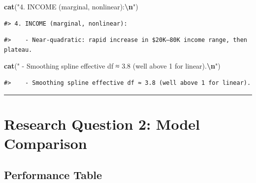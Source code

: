 \documentclass[
]{article}
\newenvironment{Shaded}{\begin{snugshade}}{\end{snugshade}}
\newcommand{\FunctionTok}[1]{\textcolor[rgb]{0.13,0.29,0.53}{\textbf{#1}}}
\newcommand{\NormalTok}[1]{#1}
\newcommand{\SpecialCharTok}[1]{\textcolor[rgb]{0.81,0.36,0.00}{\textbf{#1}}}
\newcommand{\StringTok}[1]{\textcolor[rgb]{0.31,0.60,0.02}{#1}}
\begin{document}
\begin{Shaded}
\begin{Highlighting}[]
\FunctionTok{cat}\NormalTok{(}\StringTok{"4. INCOME (marginal, nonlinear):}\SpecialCharTok{\textbackslash{}n}\StringTok{"}\NormalTok{)}
\end{Highlighting}
\end{Shaded}

\begin{verbatim}
#> 4. INCOME (marginal, nonlinear):
\end{verbatim}

\begin{Shaded}
\end{Shaded}

\begin{verbatim}
#>    - Near-quadratic: rapid increase in $20K–80K income range, then plateau.
\end{verbatim}

\begin{Shaded}
\begin{Highlighting}[]
\FunctionTok{cat}\NormalTok{(}\StringTok{"   {-} Smoothing spline effective df ≈ 3.8 (well above 1 for linear).}\SpecialCharTok{\textbackslash{}n}\StringTok{"}\NormalTok{)}
\end{Highlighting}
\end{Shaded}

\begin{verbatim}
#>    - Smoothing spline effective df ≈ 3.8 (well above 1 for linear).
\end{verbatim}

\begin{center}\rule{0.5\linewidth}{0.5pt}\end{center}

\section{Research Question 2: Model
Comparison}\label{research-question-2-model-comparison}

\subsection{Performance Table}\label{performance-table}
\end{document}
